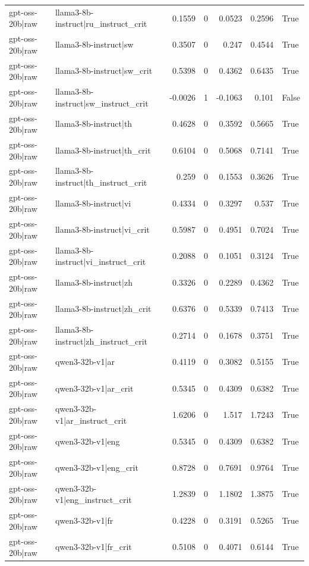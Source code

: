 \begin{table}
\begin{tabular}{l l r r r r l}
gpt-oss-20b|raw & llama3-8b-instruct|ru_instruct_crit & 0.1559 & 0 & 0.0523 & 0.2596 & True \\
gpt-oss-20b|raw & llama3-8b-instruct|sw & 0.3507 & 0 & 0.247 & 0.4544 & True \\
gpt-oss-20b|raw & llama3-8b-instruct|sw_crit & 0.5398 & 0 & 0.4362 & 0.6435 & True \\
gpt-oss-20b|raw & llama3-8b-instruct|sw_instruct_crit & -0.0026 & 1 & -0.1063 & 0.101 & False \\
gpt-oss-20b|raw & llama3-8b-instruct|th & 0.4628 & 0 & 0.3592 & 0.5665 & True \\
gpt-oss-20b|raw & llama3-8b-instruct|th_crit & 0.6104 & 0 & 0.5068 & 0.7141 & True \\
gpt-oss-20b|raw & llama3-8b-instruct|th_instruct_crit & 0.259 & 0 & 0.1553 & 0.3626 & True \\
gpt-oss-20b|raw & llama3-8b-instruct|vi & 0.4334 & 0 & 0.3297 & 0.537 & True \\
gpt-oss-20b|raw & llama3-8b-instruct|vi_crit & 0.5987 & 0 & 0.4951 & 0.7024 & True \\
gpt-oss-20b|raw & llama3-8b-instruct|vi_instruct_crit & 0.2088 & 0 & 0.1051 & 0.3124 & True \\
gpt-oss-20b|raw & llama3-8b-instruct|zh & 0.3326 & 0 & 0.2289 & 0.4362 & True \\
gpt-oss-20b|raw & llama3-8b-instruct|zh_crit & 0.6376 & 0 & 0.5339 & 0.7413 & True \\
gpt-oss-20b|raw & llama3-8b-instruct|zh_instruct_crit & 0.2714 & 0 & 0.1678 & 0.3751 & True \\
gpt-oss-20b|raw & qwen3-32b-v1|ar & 0.4119 & 0 & 0.3082 & 0.5155 & True \\
gpt-oss-20b|raw & qwen3-32b-v1|ar_crit & 0.5345 & 0 & 0.4309 & 0.6382 & True \\
gpt-oss-20b|raw & qwen3-32b-v1|ar_instruct_crit & 1.6206 & 0 & 1.517 & 1.7243 & True \\
gpt-oss-20b|raw & qwen3-32b-v1|eng & 0.5345 & 0 & 0.4309 & 0.6382 & True \\
gpt-oss-20b|raw & qwen3-32b-v1|eng_crit & 0.8728 & 0 & 0.7691 & 0.9764 & True \\
gpt-oss-20b|raw & qwen3-32b-v1|eng_instruct_crit & 1.2839 & 0 & 1.1802 & 1.3875 & True \\
gpt-oss-20b|raw & qwen3-32b-v1|fr & 0.4228 & 0 & 0.3191 & 0.5265 & True \\
gpt-oss-20b|raw & qwen3-32b-v1|fr_crit & 0.5108 & 0 & 0.4071 & 0.6144 & True \\

\end{tabular}
\end{table}
